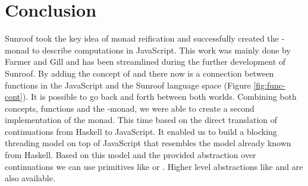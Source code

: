  
\section{Conclusion}

Sunroof took the key idea of monad reification and
successfully created the \JS-monad to describe computations
in JavaScript. This work was mainly done by Farmer and
Gill \cite{Farmer:12:WebDSLs} and has been streamlined during the 
further development of Sunroof. By adding the concept 
of  and  there now is a connection between
functions in the JavaScript and the Sunroof language space 
(Figure \ref{fig:func-cont}). It is possible to go back and forth between 
both worlds. Combining both concepts, functions and the \JS-monad,
we were able to create a second implementation of the monad. This
time based on the direct translation of continuations from Haskell
to JavaScript. It enabled us to build a blocking threading model
on top of JavaScript that resembles the model already known from Haskell.
Based on this model and the provided abstraction over continuations
we can use primitives like  or .
Higher level abstractions like  and  are also
available. 
